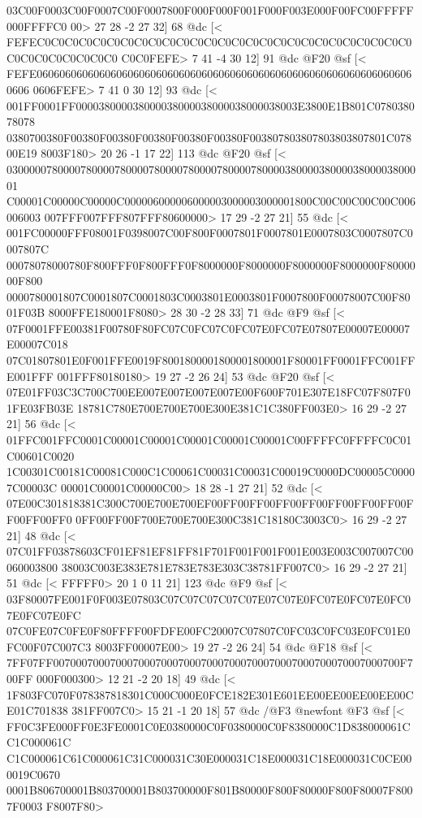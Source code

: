 03C00F0003C00F0007C00F0007800F000F000F001F000F003E000F00FC00FFFFF000FFFFC0
00>
	 27 28 -2 27 32] 68 @dc
[<
FEFEC0C0C0C0C0C0C0C0C0C0C0C0C0C0C0C0C0C0C0C0C0C0C0C0C0C0C0C0C0C0C0C0C0C0C0
C0C0FEFE>
	 7 41 -4 30 12] 91 @dc
@F20 @sf
[<
FEFE0606060606060606060606060606060606060606060606060606060606060606060606
0606FEFE>
	 7 41 0 30 12] 93 @dc
[<
001FF0001FF000038000038000038000038000038000038003E3800E1B801C078038078078
0380700380F00380F00380F00380F00380F00380F003807803807803803807801C07800E19
8003F180>
	 20 26 -1 17 22] 113 @dc
@F20 @sf
[<
03000007800007800007800007800007800007800007800003800003800003800003800001
C00001C00000C00000C000006000006000003000003000001800C00C00C00C00C006006003
007FFF007FFF807FFF80600000>
	 17 29 -2 27 21] 55 @dc
[<
001FC00000FFF08001F0398007C00F800F0007801F0007801E0007803C0007807C0007807C
00078078000780F800FFF0F800FFF0F8000000F8000000F8000000F8000000F8000000F800
0000780001807C0001807C0001803C0003801E0003801F0007800F00078007C00F8001F03B
8000FFE180001F8080>
	 28 30 -2 28 33] 71 @dc
@F9 @sf
[<
07F0001FFE00381F00780F80FC07C0FC07C0FC07E0FC07E07807E00007E00007E00007C018
07C01807801E0F001FFE0019F8001800001800001800001F80001FF0001FFC001FFE001FFF
001FFF80180180>
	 19 27 -2 26 24] 53 @dc
@F20 @sf
[<
07E01FF03C3C700C700EE007E007E007E007E00F600F701E307E18FC07F807F01FE03FB03E
18781C780E700E700E700E300E381C1C380FF003E0>
	 16 29 -2 27 21] 56 @dc
[<
01FFC001FFC0001C00001C00001C00001C00001C00001C00FFFFC0FFFFC0C01C00601C0020
1C00301C00181C00081C000C1C00061C00031C00031C00019C0000DC00005C00007C00003C
00001C00001C00000C00>
	 18 28 -1 27 21] 52 @dc
[<
07E00C301818381C300C700E700E700EF00FF00FF00FF00FF00FF00FF00FF00FF00FF00FF0
0FF00FF00F700E700E700E300C381C18180C3003C0>
	 16 29 -2 27 21] 48 @dc
[<
07C01FF03878603CF01EF81EF81FF81F701F001F001F001E003E003C007007C00060003800
38003C003E383E781E783E783E303C38781FF007C0>
	 16 29 -2 27 21] 51 @dc
[<
FFFFF0>
	 20 1 0 11 21] 123 @dc
@F9 @sf
[<
03F80007FE001F0F003E07803C07C07C07C07C07E07C07E0FC07E0FC07E0FC07E0FC07E0FC
07C0FE07C0FE0F80FFFF00FDFE00FC20007C07807C0FC03C0FC03E0FC01E0FC00F07C007C3
8003FF00007E00>
	 19 27 -2 26 24] 54 @dc
@F18 @sf
[<
7FF07FF0070007000700070007000700070007000700070007000700070007000700F700FF
000F000300>
	 12 21 -2 20 18] 49 @dc
[<
1F803FC070F078387818301C000C000E0FCE182E301E601EE00EE00EE00EE00CE01C701838
381FF007C0>
	 15 21 -1 20 18] 57 @dc
/@F3 @newfont
@F3 @sf
[<
FF0C3FE000FF0E3FE0001C0E0380000C0F0380000C0F8380000C1D838000061CC1C000061C
C1C000061C61C000061C31C000031C30E000031C18E000031C18E000031C0CE000019C0670
0001B806700001B803700001B803700000F801B80000F800F80000F800F80007F8007F0003
F8007F80>
